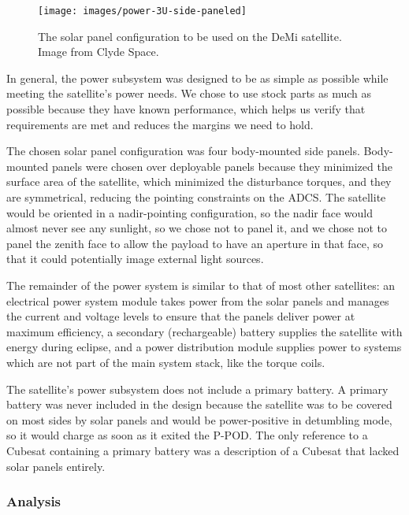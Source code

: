\documentclass[12pt]{article}
\begin{document}
			\begin{figure}%
			\centering
			\texttt{[image: images/power-3U-side-paneled]}%
			\caption{The solar panel configuration to be used on the DeMi satellite.  Image from Clyde Space.\cite{CS image}}%
			\label{fig:power-panels}%
			\end{figure}
			
In general, the power subsystem was designed to be as simple as possible while meeting the satellite's power needs.  We chose to use stock parts as much as possible because they have known performance, which helps us verify that requirements are met and reduces the margins we need to hold.

The chosen solar panel configuration was four body-mounted side panels.  Body-mounted panels were chosen over deployable panels because they minimized the surface area of the satellite, which minimized the disturbance torques, and they are symmetrical, reducing the pointing constraints on the ADCS.  The satellite would be oriented in a nadir-pointing configuration, so the nadir face would almost never see any sunlight, so we chose not to panel it, and we chose not to panel the zenith face to allow the payload to have an aperture in that face, so that it could potentially image external light sources.

The remainder of the power system is similar to that of most other satellites: an electrical power system module takes power from the solar panels and manages the current and voltage levels to ensure that the panels deliver power at maximum efficiency, a secondary (rechargeable) battery supplies the satellite with energy during eclipse, and a power distribution module supplies power to systems which are not part of the main system stack, like the torque coils.

The satellite's power subsystem does not include a primary battery.  A primary battery was never included in the design because the satellite was to be covered on most sides by solar panels and would be power-positive in detumbling mode, so it would charge as soon as it exited the P-POD.  The only reference to a Cubesat containing a primary battery was a description of a Cubesat that lacked solar panels entirely.\cite{libertad-1}
			
			\subsubsection{Analysis}\label{subsubsec:power-analysis}
			
\end{document}
